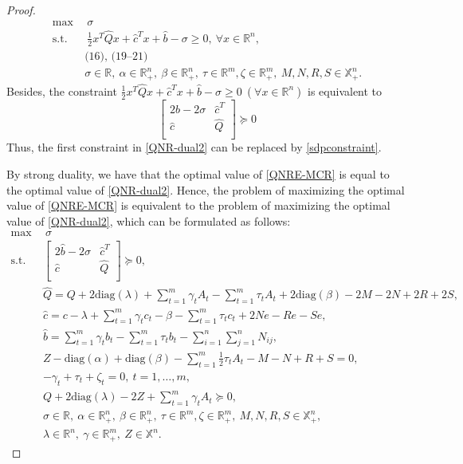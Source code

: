 \documentclass[pdflatex,sn-mathphys-num]{sn-jnl}%
\theoremstyle{thmstyleone}%
\theoremstyle{thmstyletwo}%
\theoremstyle{thmstylethree}%
\begin{document}
\begin{proof}
	\begin{equation}\label{QNR-dual2}
		\begin{aligned}
			\max ~&~ \sigma \\
			\mbox{s.t.} ~&~\frac{1}{2}x^T \hat{Q} x + \hat{c}^T x + \hat{b}-\sigma \geq 0,~\forall x\in\mathbb{R}^n,\\
			&\textrm{(16), (19--21)}\\
			&\sigma\in\mathbb{R},~\alpha\in \mathbb{R}^n_+,~\beta\in \mathbb{R}^n_+,~\tau\in \mathbb{R}^m,\zeta\in \mathbb{R}^m_+,~M,N,R,S\in\mathbb{X}_+^n.
		\end{aligned}
	\end{equation}
	Besides, the constraint $\frac{1}{2}x^T \hat{Q} x + \hat{c}^T x + \hat{b}-\sigma \geq 0~(\forall x\in\mathbb{R}^n)$ is equivalent to
	\begin{equation}\label{sdpconstraint}
		\begin{bmatrix}
			2\hat{b}-2\sigma &\hat{c}^T\\
			\hat{c} ~&\hat{Q} \\
		\end{bmatrix}\succeq 0
	\end{equation}
	Thus, the first constraint in \eqref{QNR-dual2} can be replaced by \eqref{sdpconstraint}.
	
	By strong duality, we have that the optimal value of \eqref{QNRE-MCR} is equal to the optimal value of \eqref{QNR-dual2}. Hence, the problem of maximizing the optimal value of \eqref{QNRE-MCR} is equivalent to the problem of maximizing the optimal value of \eqref{QNR-dual2}, which can be formulated as follows:
	\begin{equation}\label{QNR-dual3}
		\begin{aligned}
			\max ~&~ \sigma \\
			\mbox{s.t.} ~&\begin{bmatrix}
				2\hat{b}-2\sigma &\hat{c}^T\\
				\hat{c} ~&\hat{Q} \\
			\end{bmatrix}\succeq 0,\\
			&\hat{Q}=Q+2\textrm{diag}(\lambda)+\sum_{t=1}^m\gamma_t A_t-\sum_{t=1}^m \tau_t A_t +2\textrm{diag}(\beta)-2M-2N+2R+2S,\\
			&\hat{c}=c-\lambda+\sum_{t=1}^m \gamma_t c_t-\beta- \sum_{t=1}^m \tau_t c_t +2Ne-Re-Se,\\
			&\hat{b}=\sum_{t=1}^m \gamma_t b_t-\sum_{t=1}^m \tau_t b_t-\sum_{i=1}^n\sum_{j=1}^n N_{ij},\\
			&Z-\textrm{diag}(\alpha)+\textrm{diag}(\beta)-\sum_{t=1}^m\frac{1}{2} \tau_t A_t-M-N+R+S= 0,\\
			&-\gamma_t+\tau_t+\zeta_t=0,~t=1,\ldots,m,\\
			&Q+2\textrm{diag}(\lambda)-2Z+\sum_{t=1}^m \gamma_t A_t\succeq 0,\\
			&\sigma\in\mathbb{R},~\alpha\in \mathbb{R}^n_+,~\beta\in \mathbb{R}^n_+,~\tau\in \mathbb{R}^m,\zeta\in \mathbb{R}^m_+,~M,N,R,S\in\mathbb{X}_+^n,\\
			&\lambda\in\mathbb{R}^n,~\gamma\in\mathbb{R}^m_+,~Z\in\mathbb{X}^n.
		\end{aligned}
	\end{equation}
	

\end{proof}
\end{document}
